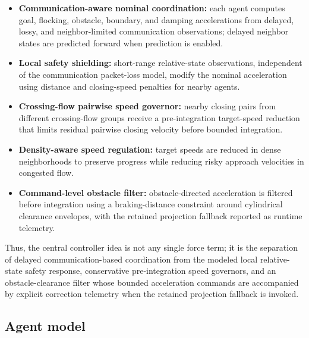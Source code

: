 \documentclass[11pt]{article}
\begin{document}
\begin{itemize}
    \item \textbf{Communication-aware nominal coordination:} each agent computes goal, flocking, obstacle, boundary, and damping accelerations from delayed, lossy, and neighbor-limited communication observations; delayed neighbor states are predicted forward when prediction is enabled.
    \item \textbf{Local safety shielding:} short-range relative-state observations, independent of the communication packet-loss model, modify the nominal acceleration using distance and closing-speed penalties for nearby agents.
    \item \textbf{Crossing-flow pairwise speed governor:} nearby closing pairs from different crossing-flow groups receive a pre-integration target-speed reduction that limits residual pairwise closing velocity before bounded integration.
    \item \textbf{Density-aware speed regulation:} target speeds are reduced in dense neighborhoods to preserve progress while reducing risky approach velocities in congested flow.
    \item \textbf{Command-level obstacle filter:} obstacle-directed acceleration is filtered before integration using a braking-distance constraint around cylindrical clearance envelopes, with the retained projection fallback reported as runtime telemetry.
\end{itemize}

Thus, the central controller idea is not any single force term; it is the separation of delayed communication-based coordination from the modeled local relative-state safety response, conservative pre-integration speed governors, and an obstacle-clearance filter whose bounded acceleration commands are accompanied by explicit correction telemetry when the retained projection fallback is invoked.

\subsection{Agent model}
\end{document}
